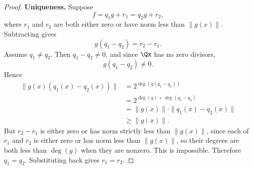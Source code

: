 \begin{proof}
\textbf{Uniqueness.}
Suppose
\[
f=q_1g+r_1=q_2g+r_2,
\]
where $r_1$ and $r_2$ are both either zero or have norm less than $\|g(x)\|$.
Subtracting gives
\[
g(q_1-q_2)=r_2-r_1.
\]
Assume $q_1\neq q_2$.  Then $q_1-q_2\neq0$, and since $\Qx$ has no
zero divisors,
\[
g(q_1-q_2)\neq0.
\]
Hence
\[
\begin{aligned}
\|g(x)(q_1(x)-q_2(x))\|
&=2^{\deg(g(q_1-q_2))}\\
&=2^{\deg(g)+\deg(q_1-q_2)}\\
&=\|g(x)\|\cdot\|q_1(x)-q_2(x)\|\\
&\geq\|g(x)\|.
\end{aligned}
\]
But $r_2-r_1$ is either zero or has norm strictly less than $\|g(x)\|$, since
each of $r_1$ and $r_2$ is either zero or has norm less than $\|g(x)\|$, so
their degrees are both less than $\deg(g)$ when they are nonzero.  This is
impossible.
Therefore $q_1=q_2$.  Substituting back gives $r_1=r_2$.
\end{proof}
